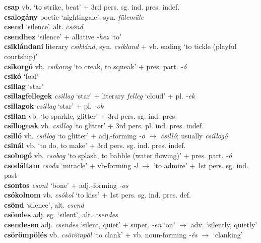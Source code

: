 \documentclass[11pt]{article}
\begin{document}
\textbf{csap} vb. `to strike, beat' + 3rd pers. sg. ind. pres. indef. \\
\textbf{csalogány} poetic `nightingale', syn. \emph{fülemüle} \\
\textbf{csend} `silence'. alt. \emph{csönd} \\
\textbf{csendhez} `silence' + allative \emph{-hez} `to' \\
\textbf{csiklándani} literary \emph{csiklánd}, syn. \emph{csikland} +
vb. ending `to tickle (playful courtship)' \\
\textbf{csikorgó} vb. \emph{csikorog} `to creak, to squeak' + pres. part. \emph{-ó} \\
\textbf{csikó} `foal' \\
\textbf{csillag} `star' \\
\textbf{csillagfellegek} \emph{csillag} `star' + literary \emph{felleg}
`cloud' + pl. \emph{-ek} \\
\textbf{csillagok} \emph{csillag} `star' + pl. \emph{-ok} \\
\textbf{csillan} vb. `to sparkle, glitter' + 3rd pers. sg. ind. pres. \\
\textbf{csillognak} vb. \emph{csillog} `to glitter' + 3rd
pers. pl. ind. pres. indef. \\
\textbf{csilló} vb. \emph{csillog} `to glitter' +
 adj.\hyp{}forming \emph{-o} $\rightarrow$ \emph{csilló};
 usually \emph{csillogó} \\
 \textbf{csinál} vb. `to do, to make' + 3rd
 pers. sg. ind. pres. indef. \\
\textbf{csobogó} vb. \emph{csobog} `to splash, to babble (water
 flowing)' + pres. part. \emph{-ó} \\
\textbf{csodáltam} \emph{csoda} `miracle' + vb\hyp{}forming \emph{-l}
$\rightarrow$ `to admire' + 1st pers. sg. ind. past \\
\textbf{csontos} \emph{csont} `bone' + adj.\hyp{}forming \emph{-os} \\
\textbf{csókolnom} vb. \emph{csókol} `to kiss' + 1st
pers. sg. ind. pres. def. \\
\textbf{csönd} `silence', alt. \emph{csend} \\
\textbf{csöndes} adj. sg. `silent', alt. \emph{csendes} \\
\textbf{csendesen} adj. \emph{csendes} `silent, quiet' +
super. \emph{-en} `on' $\rightarrow$ adv. `silently, quietly' \\
\textbf{csörömpölés} vb. \emph{csörömpöl} `to clank' +
  vb. noun\hyp{}forming \emph{-és} $\rightarrow$ `clanking' \\
\end{document}
